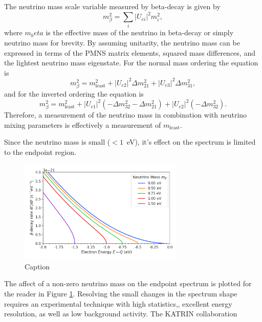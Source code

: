 The neutrino mass scale variable measured by beta-decay is given by 
\begin{equation}
    m_\beta^2=\sum_i{|U_{ei}|^2}m_i^2,
\end{equation}
where $m_beta$ is the effective mass of the neutrino in beta-decay or simply neutrino mass for brevity. By assuming unitarity, the neutrino mass can be expressed in terms of the PMNS matrix elements, squared mass differences, and the lightest neutrino mass eigenstate. For the normal mass ordering the equation is
\begin{equation}
    m_\beta^2=m^2_\textrm{least} + |U_{e2}|^2\Delta m_{21}^2 +|U_{e3}|^2\Delta m_{31}^2,
\end{equation} 
and for the inverted ordering the equation is 
\begin{equation}
    m_\beta^2=m^2_\textrm{least}+|U_{e1}|^2(-\Delta m_{32}^2-\Delta m_{21}^2)+|U_{e2}|^2(-\Delta m_{32}^2).
\end{equation}
Therefore, a measurement of the neutrino mass in combination with neutrino mixing parameters is effectively a measurement of $m_\textrm{least}$.

Since the neutrino mass is small ($<1$~eV), it's effect on the spectrum is limited to the endpoint region.
\begin{figure}[htbp]
    \centering
    \includegraphics[width=0.7\textwidth]{figs/Chapter-2/230302_atomic_tritium_spectrum_near_endpoint.png}
    \caption{Caption}
    \label{fig:chap2-atomic-tritium-endpoint}
\end{figure}
The affect of a non-zero neutrino mass on the endpoint spectrum is plotted for the reader in Figure \ref{fig:chap2-atomic-tritium-endpoint}. Resolving the small changes in the spectrum shape requires an experimental technique with high statistics,, excellent energy resolution, as well as low background activity. The KATRIN collaboration 